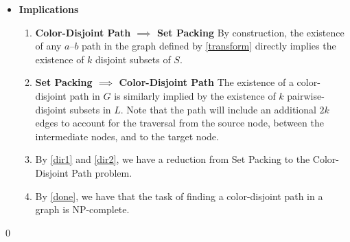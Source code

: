 \documentclass{article}
\begin{document}
\begin{itemize}
\begin{enumerate}
      \end{enumerate}

    \item \textbf{Implications} 
      \begin{enumerate}
        \item \label{dir1} 
        \textbf{Color-Disjoint Path $\implies$ Set Packing}
        By construction, the existence of any $a$--$b$ path in the
        graph defined by \ref{transform} directly implies the existence
        of $k$ disjoint subsets of $S$.

        \item \label{dir2}
        \textbf{Set Packing $\implies$ Color-Disjoint Path}
        The existence of a color-disjoint path in $G$ is similarly 
        implied by the existence of $k$ pairwise-disjoint subsets in
        $L$. Note that the path will include an additional $2k$ edges
        to account for the traversal from the source node, between
        the intermediate nodes, and to the target node.

        \item \label{done} By \ref{dir1} and \ref{dir2}, we have a reduction
        from Set Packing to the Color-Disjoint Path problem.

        \item By \ref{done}, we have that the task of finding a 
        color-disjoint path in a graph is NP-complete.

      \end{enumerate}

  \end{itemize}
  \qed
    
\end{document}

